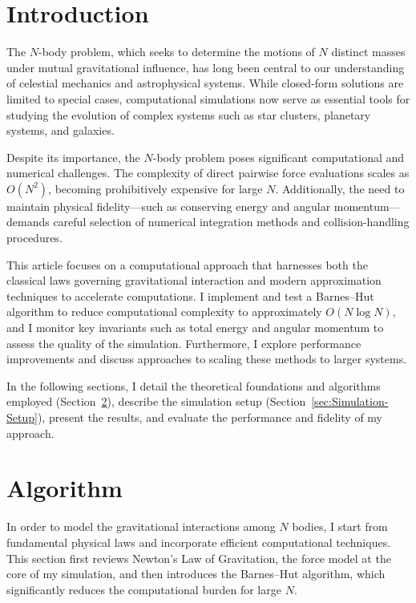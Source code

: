 \documentclass[a4paper, 12pt, oneside, onecolumn]{article}
\begin{document}
\begin{multicols}{2}


\section{Introduction}

The $N$-body problem, which seeks to determine the motions of $N$ distinct masses under mutual gravitational influence, has long been central to our understanding of celestial mechanics and astrophysical systems. While closed-form solutions are limited to special cases, computational simulations now serve as essential tools for studying the evolution of complex systems such as star clusters, planetary systems, and galaxies.

Despite its importance, the $N$-body problem poses significant computational and numerical challenges. The complexity of direct pairwise force evaluations scales as $O(N^2)$, becoming prohibitively expensive for large $N$. Additionally, the need to maintain physical fidelity—such as conserving energy and angular momentum—demands careful selection of numerical integration methods and collision-handling procedures.

This article focuses on a computational approach that harnesses both the classical laws governing gravitational interaction and modern approximation techniques to accelerate computations. I implement and test a Barnes–Hut algorithm to reduce computational complexity to approximately $O(N \log N)$, and I monitor key invariants such as total energy and angular momentum to assess the quality of the simulation. Furthermore, I explore performance improvements and discuss approaches to scaling these methods to larger systems.

In the following sections, I detail the theoretical foundations and algorithms employed (Section~\ref{sec:algorithm}), describe the simulation setup (Section~\ref{sec:Simulation-Setup}), present the results, and evaluate the performance and fidelity of my approach.


\section{Algorithm}\label{sec:algorithm}

In order to model the gravitational interactions among $N$ bodies, I start from fundamental physical laws and incorporate efficient computational techniques. This section first reviews Newton’s Law of Gravitation, the force model at the core of my simulation, and then introduces the Barnes–Hut algorithm, which significantly reduces the computational burden for large $N$.


\end{multicols}
\end{document}
